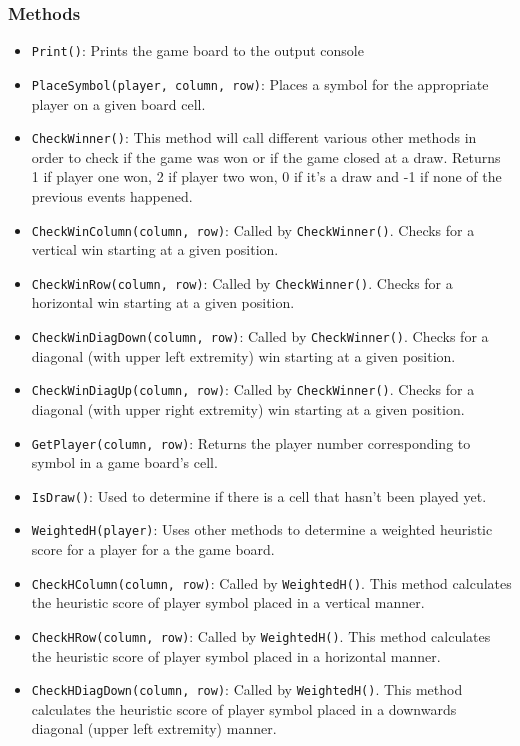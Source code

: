 \documentclass[10pt]{article}
\begin{document}
\subsubsection*{Methods}
\begin{itemize}
	\item \texttt{Print()}: Prints the game board to the output console
    \item \texttt{PlaceSymbol(player, column, row)}: Places a symbol for the appropriate player on a given board cell.
    \item \texttt{CheckWinner()}: This method will call different various other methods in order to check if the game was won or if the game closed at a draw. Returns 1 if player one won, 2 if player two won, 0 if it’s a draw and -1 if none of the previous events happened.
    \item \texttt{CheckWinColumn(column, row)}: Called by \texttt{CheckWinner()}. Checks for a vertical win starting at a given position.
    \item \texttt{CheckWinRow(column, row)}: Called by \texttt{CheckWinner()}. Checks for a horizontal win starting at a given position.
    \item \texttt{CheckWinDiagDown(column, row)}: Called by \texttt{CheckWinner()}. Checks for a diagonal (with upper left extremity) win starting at a given position.
    \item \texttt{CheckWinDiagUp(column, row)}: Called by \texttt{CheckWinner()}. Checks for a diagonal (with upper right extremity) win starting at a given position.
    \item \texttt{GetPlayer(column, row)}: Returns the player number corresponding to symbol in a game board’s cell.
    \item \texttt{IsDraw()}: Used to determine if there is a cell that hasn’t been played yet.
    \item \texttt{WeightedH(player)}: Uses other methods to determine a weighted heuristic score for a player for a the game board.
    \item \texttt{CheckHColumn(column, row)}: Called by \texttt{WeightedH()}. This method calculates the heuristic score of player symbol placed in a vertical manner.
    \item \texttt{CheckHRow(column, row)}: Called by \texttt{WeightedH()}. This method calculates the heuristic score of player symbol placed in a horizontal manner.
    \item \texttt{CheckHDiagDown(column, row)}: Called by \texttt{WeightedH()}. This method calculates the heuristic score of player symbol placed in a downwards diagonal (upper left extremity) manner.

\end{itemize}
\end{document}
